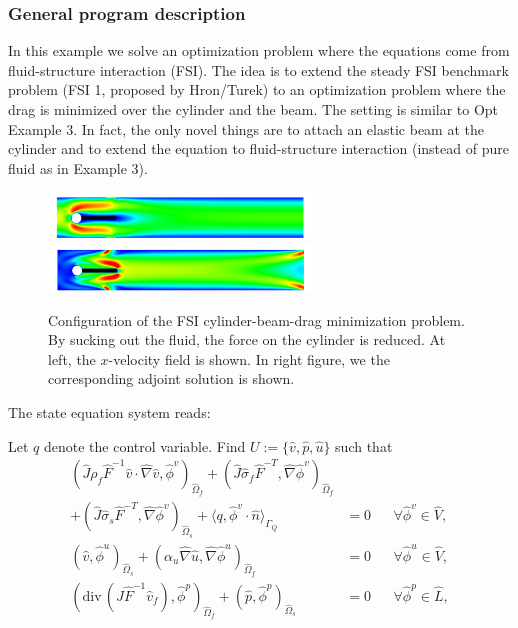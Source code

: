 \subsubsection{General program description}
In this example we solve an optimization problem where 
the equations come from fluid-structure interaction (FSI). The idea
is to extend the steady FSI benchmark problem (FSI 1, proposed by Hron/Turek) 
to an optimization 
problem where the drag is minimized over the cylinder and the beam. 
The setting is similar to Opt Example 3. In fact, the only 
novel things are to attach an elastic beam at the cylinder and to 
extend the equation to fluid-structure interaction (instead of 
pure fluid as in Example 3).

\begin{figure}[h]
\centering
    {\includegraphics[width=7cm]{Documentation/visit_fsi_1_opt_control_p3_0002_bearbeitet_Aug_15.png}}
    {\includegraphics[width=7cm]{Documentation/visit_fsi_1_opt_control_p3_0005_bearbeitet_Aug_15.png}}
  \caption{Configuration of the FSI cylinder-beam-drag minimization problem. 
By sucking out the fluid, 
the force on the cylinder is reduced. At left, the $x$-velocity field 
is shown. In right figure, we the corresponding adjoint solution is shown.}
  \label{ex_2_plots}
\end{figure}

The state equation system reads:
\begin{Problem}
Let $q$ denote the control variable. Find $U:= \{\hat v,\hat p,\hat u\}$ such that
  \begin{equation*}
    \begin{aligned}
      (\hat J \rho_f \hat F^{-1}\hat  v\cdot\hat\nabla \hat v,
      \hat\phi^v)_{\hat\Omega_f}
      + (\hat J\hat\sigma_f\hat F^{-T},\hat \nabla\hat\phi^v)_{\hat\Omega_f}\\
      + (\hat J\hat\sigma_s\hat F^{-T},\hat \nabla\hat\phi^v)_{\hat\Omega_s}
      + \langle q,\hat\phi^v\cdot \hat n\rangle_{\Gamma_Q}
      &= 0&&\forall\hat\phi^v\in \hat V,\\
      (\hat v,\hat\phi^u)_{\hat\Omega_s}
      + (\alpha_u \hat \nabla \hat u,\hat \nabla\hat\phi^u)_{\hat\Omega_f}
      &=0&&\forall\hat\phi^u\in \hat V,\\
      (\widehat{\text{div}}\,(\hat J\hat F^{-1}\hat
      v_f),\hat\phi^p)_{\hat\Omega_f} 
      + (\hat p,\hat \phi^p)_{\hat\Omega_s}
      &=0&&\forall\hat \phi^p\in \hat L,
    \end{aligned}
  \end{equation*}  
\end{Problem}

